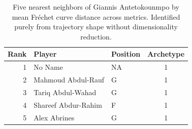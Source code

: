 \begin{table}[htbp]
  \centering\small
  \begin{tabular}{rllc}
    \toprule
    Rank & Player & Position & Archetype \\
    \midrule
    1 & No Name & NA & 1 \\
    2 & Mahmoud Abdul-Rauf & G & 1 \\
    3 & Tariq Abdul-Wahad & G & 1 \\
    4 & Shareef Abdur-Rahim & F & 1 \\
    5 & Alex Abrines & G & 1 \\
    \bottomrule
  \end{tabular}
  \caption{Five nearest neighbors of Giannis Antetokounmpo by mean Fr\'{e}chet curve distance across metrics. Identified purely from trajectory shape without dimensionality reduction.}
\end{table}


